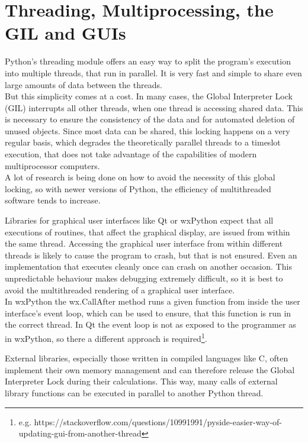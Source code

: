 	\section{Threading, Multiprocessing, the GIL and GUIs}
		Python's threading module offers an easy way to split the program's execution into multiple threads, that run in parallel.
		It is very fast and simple to share even large amounts of data between the threads.\\
		But this simplicity comes at a cost.
		In many cases, the Global Interpreter Lock (GIL) interrupts all other threads, when one thread is accessing shared data.
		This is necessary to ensure the consistency of the data and for automated deletion of unused objects.
		Since most data can be shared, this locking happens on a very regular basis, which degrades the theoretically parallel threads to a timeslot execution, that does not take advantage of the capabilities of modern multiprocessor computers.\\
		A lot of research is being done on how to avoid the necessity of this global locking, so with newer versions of Python, the efficiency of multithreaded software tends to increase.

		Libraries for graphical user interfaces like Qt or wxPython expect that all executions of routines, that affect the graphical display, are issued from within the same thread.
		Accessing the graphical user interface from within different threads is likely to cause the program to crash, but that is not ensured.
		Even an implementation that executes cleanly once can crash on another occasion.
		This unpredictable behaviour makes debugging extremely difficult, so it is best to avoid the multithreaded rendering of a graphical user interface.\\
		In wxPython the wx.CallAfter method runs a given function from inside the user interface's event loop, which can be used to ensure, that this function is run in the correct thread.
		In Qt the event loop is not as exposed to the programmer as in wxPython, so there a different approach is required\footnote{e.g. https://stackoverflow.com/questions/10991991/pyside-easier-way-of-updating-gui-from-another-thread}.

		External libraries, especially those written in compiled languages like C, often implement their own memory management and can therefore release the Global Interpreter Lock during their calculations.
		This way, many calls of external library functions can be executed in parallel to another Python thread.

